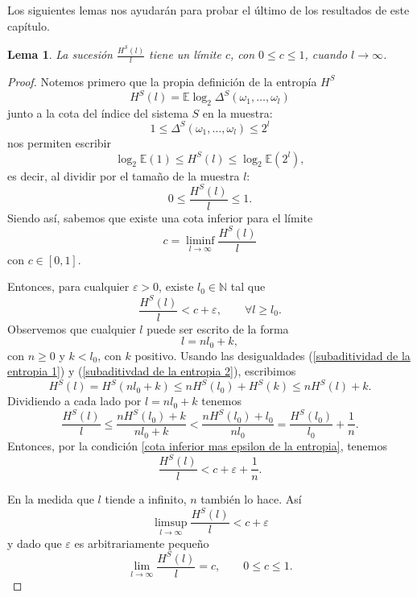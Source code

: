 \documentclass{report}
\newtheorem{lem}{Lema}[section]
\begin{document}
Los siguientes lemas nos ayudarán para probar el último de los resultados de este capítulo.\newline

\begin{lem}\label{lema 3}
    La sucesión \( \frac{H^{\mathcal{S}}(l)}{l} \) tiene un límite \( c \), con \( 0 \leq c \leq 1 \), cuando \( l \to \infty \).
\end{lem}
    
\begin{proof}
    Notemos primero que la propia definición de la entropía $H^S$
    \[
    H^S(l) = \mathbb{E}\log_2 \Delta^S(\omega_1,\ldots,\omega_l)
    \] 
    junto a la cota del índice del sistema $S$ en la muestra:
    \[
    1 \leq \Delta^S(\omega_1,\ldots,\omega_l) \leq 2^l
    \]
    nos permiten escribir
    \[
    \log_2 \mathbb{E} (1) \leq H^S(l) \leq \log_2 \mathbb{E} \left(2^l\right),
    \]
    es decir, al dividir por el tamaño de la muestra $l$:
    \begin{equation} \label{cota de la entropia}
        0 \leq \frac{H^S(l)}{l} \leq 1.
    \end{equation}
    Siendo así, sabemos que existe una cota inferior para el límite
    \[
    c = \liminf_{l\to\infty} \frac{H^S(l)}{l}
    \]
    con $c\in [0,1]$.

    Entonces, para cualquier $\varepsilon>0$, existe $l_0\in\mathbb{N}$ tal que
    \begin{equation}\label{cota inferior mas epsilon de la entropia}
        \frac{H^S(l)}{l} < c + \varepsilon, \qquad \forall l \geq l_0.
    \end{equation}
    Observemos que cualquier $l$ puede ser escrito de la forma
    \[
        l = n l_0 + k,
    \]
    con $n\geq 0$ y $k<l_0$, con $k$ positivo. Usando las desigualdades (\ref{subaditividad de la entropia 1}) 
    y (\ref{subaditivdad de la entropia 2}), escribimos
    \begin{equation*}
        H^S(l) = H^S(nl_0+k) \leq nH^S(l_0) + H^S(k) \leq nH^S(l) + k.
    \end{equation*}
    Dividiendo a cada lado por $l=nl_0+k$ tenemos
    \[
        \frac{H^S(l)}{l} \leq \frac{nH^S(l_0) + k}{nl_0+k} < \frac{nH^S(l_0) + l_0}{nl_0} = \frac{H^S(l_0)}{l_0} + \frac{1}{n}.
    \]
    Entonces, por la condición \ref{cota inferior mas epsilon de la entropia}, tenemos
    \[
    \frac{H^S(l)}{l} < c + \varepsilon + \frac{1}{n}.
    \]

    En la medida que $l$ tiende a infinito, $n$ también lo hace. Así
    \[
        \limsup_{l\to\infty} \frac{H^S(l)}{l} < c + \varepsilon
    \]
y dado que $\varepsilon$ es arbitrariamente pequeño
    \[
        \lim_{l\to\infty} \frac{H^S(l)}{l} = c, \qquad 0\leq c\leq 1.
    \]
\end{proof}
\end{document}
